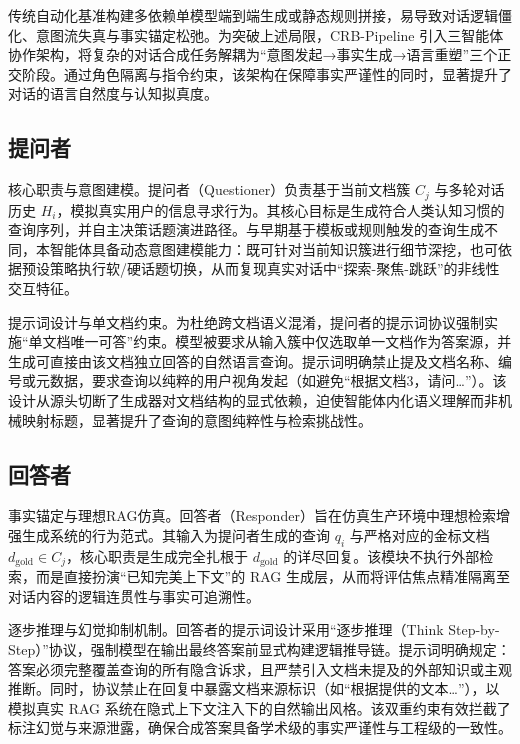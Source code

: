 传统自动化基准构建多依赖单模型端到端生成或静态规则拼接，易导致对话逻辑僵化、意图流失真与事实锚定松弛。为突破上述局限，CRB-Pipeline 引入三智能体协作架构，将复杂的对话合成任务解耦为“意图发起→事实生成→语言重塑”三个正交阶段。通过角色隔离与指令约束，该架构在保障事实严谨性的同时，显著提升了对话的语言自然度与认知拟真度。



\subsection{提问者}



核心职责与意图建模。提问者（Questioner）负责基于当前文档簇 $C_j$ 与多轮对话历史 $H_i$，模拟真实用户的信息寻求行为。其核心目标是生成符合人类认知习惯的查询序列，并自主决策话题演进路径。与早期基于模板或规则触发的查询生成不同，本智能体具备动态意图建模能力：既可针对当前知识簇进行细节深挖，也可依据预设策略执行软/硬话题切换，从而复现真实对话中“探索-聚焦-跳跃”的非线性交互特征。



提示词设计与单文档约束。为杜绝跨文档语义混淆，提问者的提示词协议强制实施“单文档唯一可答”约束。模型被要求从输入簇中仅选取单一文档作为答案源，并生成可直接由该文档独立回答的自然语言查询。提示词明确禁止提及文档名称、编号或元数据，要求查询以纯粹的用户视角发起（如避免“根据文档3，请问…”）。该设计从源头切断了生成器对文档结构的显式依赖，迫使智能体内化语义理解而非机械映射标题，显著提升了查询的意图纯粹性与检索挑战性。



\subsection{回答者}



事实锚定与理想RAG仿真。回答者（Responder）旨在仿真生产环境中理想检索增强生成系统的行为范式。其输入为提问者生成的查询 $q_i$ 与严格对应的金标文档 $d_{\text{gold}} \in C_j$，核心职责是生成完全扎根于 $d_{\text{gold}}$ 的详尽回复。该模块不执行外部检索，而是直接扮演“已知完美上下文”的 RAG 生成层，从而将评估焦点精准隔离至对话内容的逻辑连贯性与事实可追溯性。



逐步推理与幻觉抑制机制。回答者的提示词设计采用“逐步推理（Think Step-by-Step）”协议，强制模型在输出最终答案前显式构建逻辑推导链。提示词明确规定：答案必须完整覆盖查询的所有隐含诉求，且严禁引入文档未提及的外部知识或主观推断。同时，协议禁止在回复中暴露文档来源标识（如“根据提供的文本…”），以模拟真实 RAG 系统在隐式上下文注入下的自然输出风格。该双重约束有效拦截了标注幻觉与来源泄露，确保合成答案具备学术级的事实严谨性与工程级的一致性。



